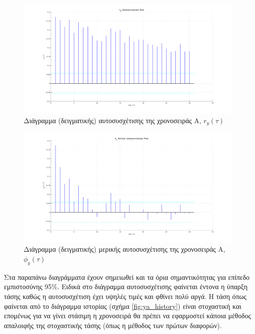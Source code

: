 \begin{figure}[H]
    \begin{center}
        \includegraphics[width=\textwidth]{plots/ya_initial_autocorrelation.svg.pdf}
        \caption{Διάγραμμα (δειγματικής) αυτοσυσχέτισης της χρονοσειράς Α, $r_y(\tau)$}
        \label{fig:ya_initial_autocorrelation}
    \end{center}
\end{figure}

\begin{figure}[H]
    \begin{center}
        \includegraphics[width=\textwidth]{plots/ya_initial_partial_autocorrelation.svg.pdf}
        \caption{Διάγραμμα (δειγματικής) μερικής αυτοσυσχέτισης της χρονοσειράς Α, $\phi_y(\tau)$}
        \label{fig:ya_initial_partial_autocorrelation}
    \end{center}
\end{figure}

Στα παραπάνω διαγράμματα έχουν σημειωθεί και τα όρια σημαντικότητας για επίπεδο εμπιστοσύνης 95\%. Ειδικά στο διάγραμμα αυτοσυσχέτισης φαίνεται έντονα η ύπαρξη τάσης καθώς η αυτοσυσχέτιση έχει υψηλές τιμές και φθίνει πολύ αργά. Η τάση όπως φαίνεται από το διάγραμμα ιστορίας (σχήμα \ref{fig:ya_history}) είναι στοχαστική και επομένως για να γίνει στάσιμη η χρονοσειρά θα πρέπει να εφαρμοστεί κάποια μέθοδος απαλοιφής της στοχαστικής τάσης (όπως η μέθοδος των πρώτων διαφορών).

